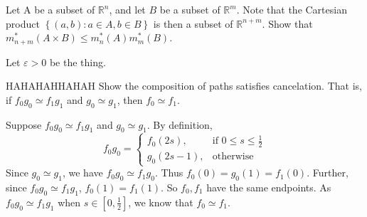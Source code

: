 
\begin{problem}{1}
  Let A be a subset of $\mathbb{R}^{n}$, and let $B$ be a subset of $\mathbb{R}^{m}$.
  Note that the Cartesian product $\left\{ \left( a,b \right) : a \in A, b \in B \right\}$ is then a subset of $\mathbb{R}^{n+m}$.
  Show that $m_{n+m}^{*}(A \times B) \leq m_{n}^{*}(A)m_{m}^{*}(B)$.
\end{problem} 

\begin{solution}
  
  Let $ \varepsilon > 0$  be the thing.

  
\end{solution}

\begin{problem}{2}
  HAHAHAHHAHAH
  Show the composition of paths satisfies cancelation.
  That is, if $f_0 g_0 \simeq f_1 g_1$ and  $g_0 \simeq g_1$,
  then $f_0 \simeq f_1$.
\end{problem}
    
\begin{solution}
  Suppose $f_0 g_0 \simeq f_1 g_1$ and  $g_0 \simeq g_1$.
  By definition,
  \[
    f_0 g_0 = 
    \left\{
    \begin{array}{lr}
      f_0(2s), & \text{if } 0 \leq s \leq \frac{1}{2}\\
      g_0(2s - 1), & \text{otherwise} 
    \end{array}
    \right.
  \]
  Since $g_0 \simeq g_1$, we have $f_0 g_0 \simeq f_1 g_0$.
  Thus $f_0(0) = g_0(1) = f_1(0)$.
  Further, since $f_0 g_0 \simeq f_1 g_1$, $f_0(1) = f_1(1)$.
  So $f_0,f_1$ have the same endpoints.
  As $f_0 g_0 \simeq f_1 g_1$ when $s \in [0,\frac{1}{2}]$,
  we know that $f_0 \simeq f_1$.
\end{solution}
